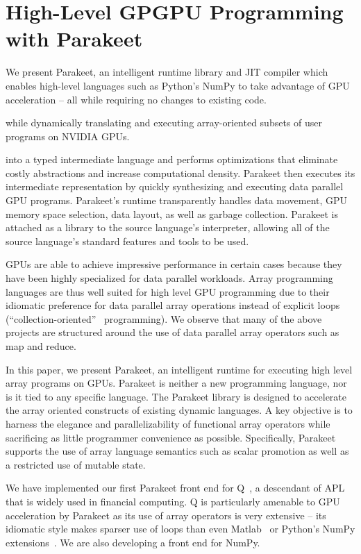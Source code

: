 \documentclass[10pt,twocolumn]{article}
\begin{document}
\section*{High-Level GPGPU Programming with Parakeet}
We present Parakeet, an intelligent runtime library and JIT compiler which enables high-level languages such as Python's NumPy to take advantage of GPU acceleration -- all while requiring no changes to existing code.

while dynamically translating and executing array-oriented subsets of user programs on NVIDIA GPUs.

into a typed intermediate language and performs optimizations that eliminate costly abstractions and increase computational density. Parakeet then executes its intermediate representation by quickly synthesizing and executing data parallel GPU programs. Parakeet's runtime transparently handles data movement, GPU memory space selection, data layout, as well as garbage collection. Parakeet is attached as a library to the source language's interpreter, allowing all of the source language's standard features and tools to be used.

GPUs are able to achieve impressive performance in certain cases because they have been highly specialized for data parallel workloads.  Array programming languages are thus well suited for high level GPU programming due to their idiomatic preference for data parallel array operations instead of explicit loops (``collection-oriented''~\cite{Sip91} programming). We observe that many of the above projects are structured around the use of data parallel array operators such as map and reduce.

In this paper, we present Parakeet, an intelligent runtime for executing high level array programs on GPUs. Parakeet is neither a new programming language, nor is it tied to any specific language. The Parakeet library is designed to accelerate the array oriented constructs of existing dynamic languages. A key objective is to harness the elegance and parallelizability of functional array operators while sacrificing as little programmer convenience as possible.  Specifically, Parakeet supports the use of array language semantics such as scalar promotion as well as a restricted use of mutable state.

We have implemented our first Parakeet front end for Q~\cite{Borr08}, a descendant of APL that is widely used in financial computing. Q is particularly amenable to GPU acceleration by Parakeet as its use of array operators is very extensive -- its idiomatic style makes sparser use of loops than even Matlab~\cite{Moler80} or Python's NumPy extensions~\cite{Oliphant07}. We are also developing a front end for NumPy.
\end{document}
